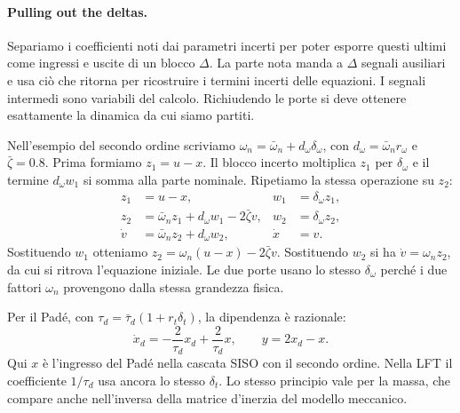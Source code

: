 \paragraph*{Pulling out the deltas.}
Separiamo i coefficienti noti dai parametri incerti per poter esporre
questi ultimi come ingressi e uscite di un blocco $\Delta$. La parte
nota manda a $\Delta$ segnali ausiliari e usa ciò che ritorna per
ricostruire i termini incerti delle equazioni. I segnali intermedi
sono variabili del calcolo. Richiudendo le porte si deve ottenere
esattamente la dinamica da cui siamo partiti.

Nell'esempio del secondo ordine scriviamo
$\omega_n=\bar\omega_n+d_\omega\delta_\omega$, con
$d_\omega=\bar\omega_nr_\omega$ e $\bar\zeta=0.8$. Prima formiamo
$z_1=u-x$. Il blocco incerto moltiplica $z_1$ per $\delta_\omega$
e il termine $d_\omega w_1$ si somma alla parte nominale.
Ripetiamo la stessa operazione su $z_2$:
\begin{align*}
 z_1&=u-x,& w_1&=\delta_\omega z_1,\\
 z_2&=\bar\omega_nz_1+d_\omega w_1-2\bar\zeta v,
 &w_2&=\delta_\omega z_2,\\
 \dot v&=\bar\omega_nz_2+d_\omega w_2,&\dot x&=v.
\end{align*}
Sostituendo $w_1$ otteniamo $z_2=\omega_n(u-x)-2\bar\zeta v$.
Sostituendo $w_2$ si ha $\dot v=\omega_nz_2$, da cui si ritrova
l'equazione iniziale. Le due porte usano lo stesso $\delta_\omega$
perché i due fattori $\omega_n$ provengono dalla stessa grandezza
fisica.

Per il Padé, con $\tau_d=\bar\tau_d(1+r_t\delta_t)$, la dipendenza è
razionale:
\[
 \dot x_d=-\frac{2}{\tau_d}x_d+\frac{2}{\tau_d}x,
 \qquad y=2x_d-x.
\]
Qui $x$ è l'ingresso del Padé nella cascata SISO con il secondo ordine.
Nella LFT il coefficiente $1/\tau_d$ usa ancora lo stesso $\delta_t$.
Lo stesso principio vale per la massa, che compare anche nell'inversa
della matrice d'inerzia del modello meccanico.

